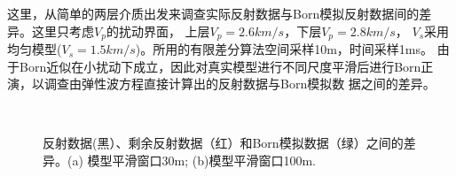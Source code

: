 这里，从简单的两层介质出发来调查实际反射数据与Born模拟反射数据间的差异。这里只考虑$V_p$的扰动界面，
上层$V_p=2.6km/s$，下层$V_p=2.8km/s$， $V_s$采用均匀模型($V_s=1.5km/s$)。所用的有限差分算法空间采样10m，时间采样1ms。
由于Born近似在小扰动下成立，因此对真实模型进行不同尺度平滑后进行Born正演，以调查由弹性波方程直接计算出的反射数据与Born模拟数
据之间的差异。
\begin{figure}[!htb]
   \centering
   \\
   \caption{反射数据(黑）、剩余反射数据（红）和Born模拟数据（绿）之间的差异。(a)
   模型平滑窗口30m; (b)模型平滑窗口100m.}
   \label{fig:refl_born_comparison}
\end{figure}
